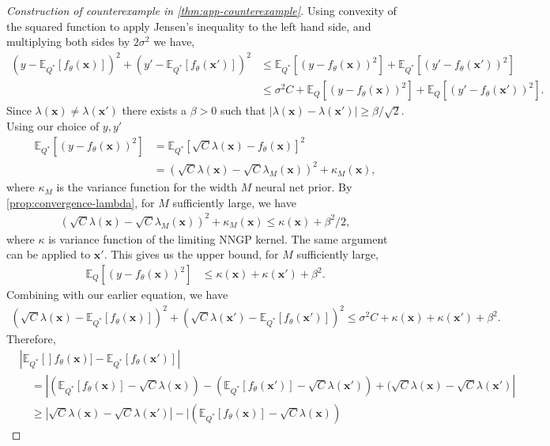 \documentclass[twoside]{article}
\newcommand{\vx}{\mathbf{x}}
\newcommand{\E}{\mathbb{E}}
\newcommand{\Q}{\mathbb{Q}}
\renewcommand{\Q}{\ensuremath{Q}}
\theoremstyle{theoremstyle}
\begin{document}
\begin{proof}[Construction of counterexample in \cref{thm:app-counterexample}]
Using convexity of the squared function to apply Jensen's inequality to the left hand side, and multiplying both sides by $2\sigma^2$ we have,
\begin{align}
    (y-\E_{\Q^*}[f_{\theta}(\vx)])^2+(y'-\E_{\Q^*}[f_{\theta}(\vx')])^2 & \leq \E_{\Q^*}[(y-f_{\theta}(\vx))^2]+\E_{\Q^*}[(y'-f_{\theta}(\vx'))^2] \\
     & \leq \sigma^2 C +\E_{\Q}[(y-f_{\theta}(\vx))^2]+\E_{\Q}[(y'-f_{\theta}(\vx'))^2].
\end{align}
Since $\lambda(\vx) \neq \lambda(\vx')$ there exists a $\beta>0$ such that $|\lambda(\vx)-\lambda(\vx')| \geq \beta/\sqrt{2}$. Using our choice of $y,y'$ 
\begin{align}
    \E_{\Q^*}[(y-f_{\theta}(\vx))^2]&= \E_{\Q^*}{[\sqrt{C}\lambda(\vx)-f_{\theta}(\vx)]^2}\\
    & =(\sqrt{C}\lambda(\vx)-\sqrt{C}\lambda_M(\vx))^2+ \kappa_M(\vx),
\end{align}
where $\kappa_M$ is the variance function for the width $M$ neural net prior. By \cref{prop:convergence-lambda}, for $M$ sufficiently large, we have 
\begin{align}
    (\sqrt{C}\lambda(\vx)-\sqrt{C}\lambda_M(\vx))^2+ \kappa_M(\vx) \leq \kappa(\vx) + \beta^2/2,
\end{align}
where $\kappa$ is variance function of the limiting NNGP kernel. The same argument can be applied to $\vx'$. This gives us the upper bound, for $M$ sufficiently large, 
\begin{align}
    \E_{\Q}[(y-f_{\theta}(\vx))^2]& \leq \kappa(\vx)+\kappa(\vx') + \beta^2.
\end{align}
Combining with our earlier equation, we have
\begin{align}\label{eqn:bound-on-mse}
    (\sqrt{C}\lambda(\vx)-\E_{\Q^*}[f_{\theta}(\vx)])^2+(\sqrt{C}\lambda(\vx')-\E_{\Q^*}[f_{\theta}(\vx')])^2 \leq \sigma^2C + \kappa(\vx) + \kappa(\vx') + \beta^2.
\end{align}
Therefore,
\begin{align}
    &|\E_{\Q^*}[]f_{\theta}(\vx)]- \E_{\Q^*}[f_{\theta}(\vx')]| \nonumber \\
    &\quad=
        |
            (\E_{\Q^*}[f_{\theta}(\vx)] - \sqrt{C}\lambda(\vx)) 
            - (\E_{\Q^*}[f_{\theta}(\vx')] - \sqrt{C}\lambda(\vx'))
            + (\sqrt{C}\lambda(\vx)  - \sqrt{C}\lambda(\vx')
        | \\
    &\quad\ge
        |\sqrt{C}\lambda(\vx)  - \sqrt{C}\lambda(\vx')|
        -
            |
                (\E_{\Q^*}[f_{\theta}(\vx)] - \sqrt{C}\lambda(\vx))

\end{align}
\end{proof}
\end{document}

